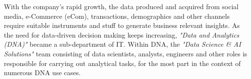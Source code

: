 With the company's rapid growth, the data produced and acquired from social media, e-Commerce (eCom), transactions, demographics and other channels require suitable instruments and stuff to generate business relevant insights. As the need for data-driven decision making keeps increasing, \textit{"Data and Analytics (DNA)"} became a sub-department of IT. Within DNA, the \textit{"Data Science \& AI Solutions"} team consisting of data scientists, analysts, engineers and other roles is responsible for carrying out analytical tasks, for the most part in the context of numerous DNA use cases.









